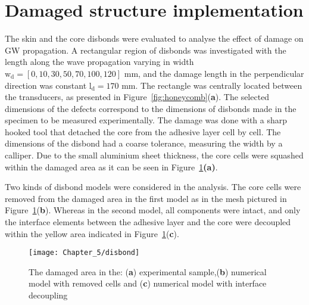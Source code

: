 \section{Damaged structure implementation}
\label{sec:disbond}
The skin and the core disbonds were evaluated to analyse the effect of damage on GW propagation.
A rectangular region of disbonds was investigated with the length along the wave propagation varying in width \(\mathrm{w_d} = [0,10,30,50,70,100,120]\) mm, and the damage length in the perpendicular direction was constant \(\mathrm{l_d} = 170\) mm.
The rectangle was centrally located between the transducers, as presented in Figure~\ref{fig:honeycomb}(\textbf{a}).
The selected dimensions of the defects correspond to the dimensions of disbonds made in the specimen to be measured experimentally.
The damage was done with a sharp hooked tool that detached the core from the adhesive layer cell by cell.
The dimensions of the disbond had a coarse tolerance, measuring the width by a calliper.
Due to the small aluminium sheet thickness, the core cells were squashed within the damaged area as it can be seen in Figure~\ref{fig:disbond}\textbf{(a)}.

Two kinds of disbond models were considered in the analysis.
The core cells were removed from the damaged area in the first model as in the mesh pictured in Figure~\ref{fig:disbond}(\textbf{b}).
Whereas in the second model, all components were intact, and only the interface elements between the adhesive layer and the core were decoupled within the yellow area indicated in Figure~\ref{fig:disbond}(\textbf{c}).
\begin{figure}[!bh]
	\begin{center}
		\texttt{[image: Chapter\_5/disbond]}
	\end{center}
	\caption{The damaged area in the: (\textbf{a}) experimental sample,(\textbf{b}) numerical model with removed cells and (\textbf{c}) numerical model with interface decoupling}
	\label{fig:disbond}
\end{figure}